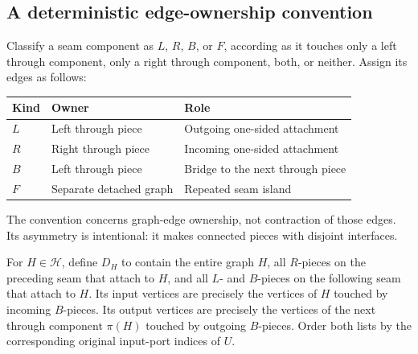 \documentclass[11pt]{article}
\theoremstyle{remark}\newtheorem{remark}[theorem]{Remark}
\begin{document}
\subsection{A deterministic edge-ownership convention}
Classify a seam component as $L$, $R$, $B$, or $F$, according as it touches only a left through component, only a right through component, both, or neither. Assign its edges as follows:
\begin{center}
\begin{tabular}{lll}\toprule
Kind & Owner & Role\\\midrule
$L$ & Left through piece & Outgoing one-sided attachment\\
$R$ & Right through piece & Incoming one-sided attachment\\
$B$ & Left through piece & Bridge to the next through piece\\
$F$ & Separate detached graph & Repeated seam island\\\bottomrule
\end{tabular}
\end{center}
The convention concerns graph-edge ownership, not contraction of those edges. Its asymmetry is intentional: it makes connected pieces with disjoint interfaces.

For $H\in\mathcal H$, define $D_H$ to contain the entire graph $H$, all $R$-pieces on the preceding seam that attach to $H$, and all $L$- and $B$-pieces on the following seam that attach to $H$. Its input vertices are precisely the vertices of $H$ touched by incoming $B$-pieces. Its output vertices are precisely the vertices of the next through component $\pi(H)$ touched by outgoing $B$-pieces. Order both lists by the corresponding original input-port indices of $U$.
\end{document}
